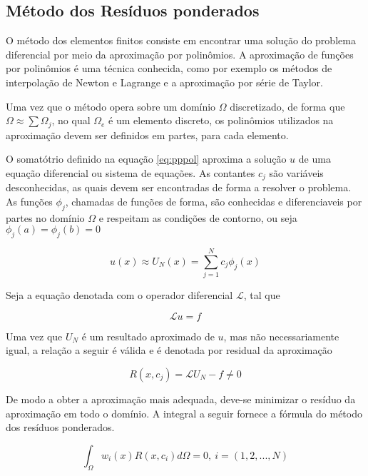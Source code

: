 \subsection{Método dos Resíduos ponderados}

O método dos elementos finitos consiste em encontrar uma  solução do problema diferencial por meio da aproximação por polinômios. 
\citep[p. 97]{davis}
A aproximação de funções por polinômios é uma técnica conhecida, como por exemplo os métodos de interpolação de Newton e Lagrange e a aproximação por série de Taylor. 

Uma vez que o método opera sobre um domínio $ \Omega $ discretizado, de forma que $ \Omega \approx \sum \Omega_j $, no qual $ \Omega_e $ é um elemento discreto, os polinômios utilizados na aproximação devem ser definidos em partes, para cada elemento.

O somatótrio definido na equação \ref{eq:pppol} aproxima a solução $ u $ de uma equação diferencial ou sistema de equações. As contantes $ c_j $ são variáveis desconhecidas, as quais devem ser encontradas de forma a resolver o problema. As funções $ \phi_j $, chamadas de funções de forma, são conhecidas e diferenciaveis por partes no domínio $ \Omega $ e respeitam as condições de contorno, ou seja $ \phi_j(a) = \phi_j(b) = 0 $
 

\begin{equation}
	\label{eq:pppol}
	u(x) \approx U_N (x) = \sum_{j = 1}^{N} c_j \phi_j (x)
\end{equation}

 Seja a equação denotada com o operador diferencial $ \mathcal{L} $, tal que
 
 \begin{equation}
 	\mathcal{L} u = f
 \end{equation}
 
 Uma vez que $U_N$ é um resultado aproximado de $u$, mas não necessariamente igual, a relação a seguir é válida e é denotada por residual da aproximação
 
 \begin{equation}
 	R(x, c_j) = \mathcal{L} U_N - f \neq 0
 \end{equation}
 
 De modo a obter a aproximação mais adequada, deve-se minimizar o resíduo da aproximação em todo o domínio. A integral a seguir fornece a fórmula do método dos resíduos ponderados.
 
 \begin{equation}
 \label{eq:intResPond}
	\int_{\Omega} w_i(x)R(x, c_i)d\Omega = 0, \ i = (1, 2, ..., N)
 \end{equation} 
 
